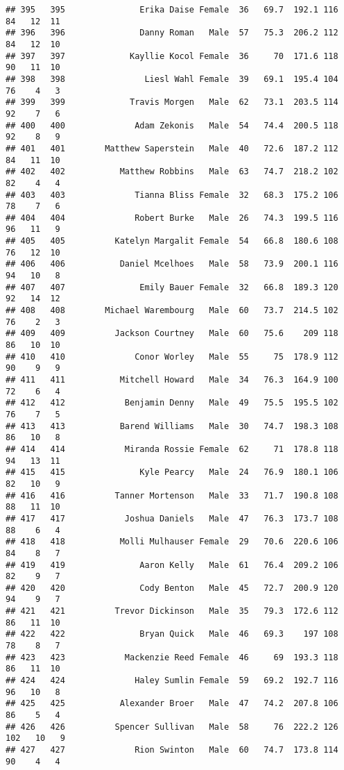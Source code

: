 \documentclass[
]{article}
\begin{document}
\begin{verbatim}
## 395   395               Erika Daise Female  36   69.7  192.1 116  84   12  11
## 396   396               Danny Roman   Male  57   75.3  206.2 112  84   12  10
## 397   397             Kayllie Kocol Female  36     70  171.6 118  90   11  10
## 398   398                Liesl Wahl Female  39   69.1  195.4 104  76    4   3
## 399   399             Travis Morgen   Male  62   73.1  203.5 114  92    7   6
## 400   400              Adam Zekonis   Male  54   74.4  200.5 118  92    8   9
## 401   401        Matthew Saperstein   Male  40   72.6  187.2 112  84   11  10
## 402   402           Matthew Robbins   Male  63   74.7  218.2 102  82    4   4
## 403   403              Tianna Bliss Female  32   68.3  175.2 106  78    7   6
## 404   404              Robert Burke   Male  26   74.3  199.5 116  96   11   9
## 405   405          Katelyn Margalit Female  54   66.8  180.6 108  76   12  10
## 406   406           Daniel Mcelhoes   Male  58   73.9  200.1 116  94   10   8
## 407   407               Emily Bauer Female  32   66.8  189.3 120  92   14  12
## 408   408        Michael Warembourg   Male  60   73.7  214.5 102  76    2   3
## 409   409          Jackson Courtney   Male  60   75.6    209 118  86   10  10
## 410   410              Conor Worley   Male  55     75  178.9 112  90    9   9
## 411   411           Mitchell Howard   Male  34   76.3  164.9 100  72    6   4
## 412   412            Benjamin Denny   Male  49   75.5  195.5 102  76    7   5
## 413   413           Barend Williams   Male  30   74.7  198.3 108  86   10   8
## 414   414            Miranda Rossie Female  62     71  178.8 118  94   13  11
## 415   415               Kyle Pearcy   Male  24   76.9  180.1 106  82   10   9
## 416   416          Tanner Mortenson   Male  33   71.7  190.8 108  88   11  10
## 417   417            Joshua Daniels   Male  47   76.3  173.7 108  88    6   4
## 418   418           Molli Mulhauser Female  29   70.6  220.6 106  84    8   7
## 419   419               Aaron Kelly   Male  61   76.4  209.2 106  82    9   7
## 420   420               Cody Benton   Male  45   72.7  200.9 120  94    9   7
## 421   421          Trevor Dickinson   Male  35   79.3  172.6 112  86   11  10
## 422   422               Bryan Quick   Male  46   69.3    197 108  78    8   7
## 423   423            Mackenzie Reed Female  46     69  193.3 118  86   11  10
## 424   424              Haley Sumlin Female  59   69.2  192.7 116  96   10   8
## 425   425           Alexander Broer   Male  47   74.2  207.8 106  86    5   4
## 426   426          Spencer Sullivan   Male  58     76  222.2 126 102   10   9
## 427   427              Rion Swinton   Male  60   74.7  173.8 114  90    4   4

\end{verbatim}
\end{document}
